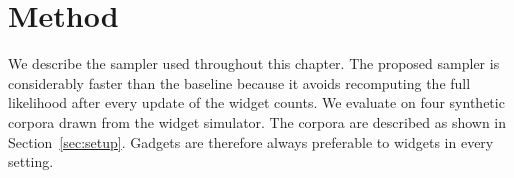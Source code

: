 \section{Method}
\label{sec:method}
We describe the sampler used throughout this chapter.
The proposed sampler is considerably faster than the baseline because it
avoids recomputing the full likelihood after every update of the widget counts.
We evaluate on four synthetic corpora drawn from the widget simulator.
The corpora are described as shown in Section~\ref{sec:setup}.
Gadgets are therefore always preferable to widgets in every setting.

